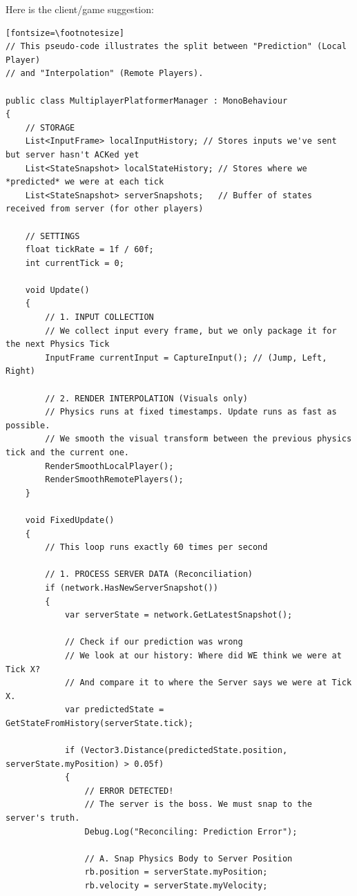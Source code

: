 \documentclass{article}
\begin{document}
\par Here is the client/game suggestion:
\begin{verbatim}[fontsize=\footnotesize]
// This pseudo-code illustrates the split between "Prediction" (Local Player)
// and "Interpolation" (Remote Players).

public class MultiplayerPlatformerManager : MonoBehaviour
{
    // STORAGE
    List<InputFrame> localInputHistory; // Stores inputs we've sent but server hasn't ACKed yet
    List<StateSnapshot> localStateHistory; // Stores where we *predicted* we were at each tick
    List<StateSnapshot> serverSnapshots;   // Buffer of states received from server (for other players)

    // SETTINGS
    float tickRate = 1f / 60f;
    int currentTick = 0;

    void Update()
    {
        // 1. INPUT COLLECTION
        // We collect input every frame, but we only package it for the next Physics Tick
        InputFrame currentInput = CaptureInput(); // (Jump, Left, Right)

        // 2. RENDER INTERPOLATION (Visuals only)
        // Physics runs at fixed timestamps. Update runs as fast as possible.
        // We smooth the visual transform between the previous physics tick and the current one.
        RenderSmoothLocalPlayer();
        RenderSmoothRemotePlayers();
    }

    void FixedUpdate()
    {
        // This loop runs exactly 60 times per second

        // 1. PROCESS SERVER DATA (Reconciliation)
        if (network.HasNewServerSnapshot())
        {
            var serverState = network.GetLatestSnapshot();

            // Check if our prediction was wrong
            // We look at our history: Where did WE think we were at Tick X?
            // And compare it to where the Server says we were at Tick X.
            var predictedState = GetStateFromHistory(serverState.tick);

            if (Vector3.Distance(predictedState.position, serverState.myPosition) > 0.05f)
            {
                // ERROR DETECTED!
                // The server is the boss. We must snap to the server's truth.
                Debug.Log("Reconciling: Prediction Error");

                // A. Snap Physics Body to Server Position
                rb.position = serverState.myPosition;
                rb.velocity = serverState.myVelocity;


\end{verbatim}
\end{document}
